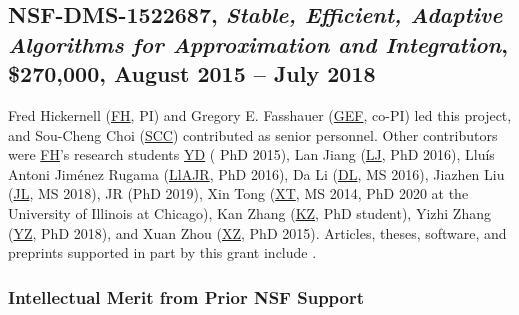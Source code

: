 \documentclass[11pt]{NSFamsart}
\newcommand{\FH}{\hyperlink{FHlink}{FH}\xspace}
\newcommand{\SCTC}{\hyperlink{SCTClink}{SCC}\xspace}
\newcommand{\GEF}{\hyperlink{GEFlink}{GEF}\xspace}
\newcommand{\YD}{\hyperlink{YDlink}{YD}\xspace}
\newcommand{\LlAJR}{\hyperlink{LlAJRlink}{LlAJR}\xspace}
\newcommand{\LJ}{\hyperlink{LJlink}{LJ}\xspace}
\newcommand{\XT}{\hyperlink{XTlink}{XT}\xspace}
\newcommand{\KZ}{\hyperlink{KZlink}{KZ}\xspace}
\newcommand{\DL}{\hyperlink{DLlink}{DL}\xspace}
\newcommand{\XZ}{\hyperlink{XZlink}{XZ}\xspace}
\newcommand{\JL}{\hyperlink{JLlink}{JL}\xspace}
\newcommand{\YZ}{\hyperlink{YZlink}{YZ}\xspace}
\def\abs#1{\ensuremath{\left \lvert #1 \right \rvert}}
\begin{document}
\subsection{NSF-DMS-1522687, \emph{Stable, Efficient, Adaptive Algorithms for
			Approximation and Integration},
		\$270,000, August 2015 -- July 2018} \label{sec:PreviousFred}
Fred Hickernell (\FH, PI) and Gregory E. Fasshauer (\GEF, co-PI) led this project, and Sou-Cheng Choi (\SCTC) contributed as senior personnel.  Other contributors were \FH's research students {\YD} ( PhD 2015), \hypertarget{LJlink}{ Lan Jiang } (\LJ, PhD 2016),
\hypertarget{LlAJRlink}{Llu\'is Antoni Jim\'enez Rugama} (\LlAJR, PhD 2016), \hypertarget{DLlink}{Da Li} (\DL, MS 2016), \hypertarget{JLlink}{Jiazhen Liu} (\JL, MS 2018), JR (PhD 2019), \hypertarget{XTlink}{Xin Tong} (\XT, MS 2014, PhD 2020 at the University of Illinois at Chicago), \hypertarget{KZlink}{Kan Zhang} (\KZ, PhD student), \hypertarget{YZlink}{Yizhi Zhang} (\YZ, PhD 2018), and \hypertarget{XZlink}{Xuan Zhou} (\XZ, PhD 2015).  Articles, theses,
software, and preprints supported in
part by this
grant
include
\cite{ala_augmented_2017,
	ChoEtal17a,
	ChoEtal21a,
	Din15a,
	DinHic20a,
	GilEtal16a,
	Hic17a,
	HicJag18b,
	HicJim16a,
	HicEtal18a,
	HicEtal17a,
	HicKriWoz19a,
	RatHic19a,
	GilJim16b,
	JimHic16a,
	JohFasHic18a,
	Li16a,
	Liu17a,
	MarEtal18a,
	mccourt_stable_2017,
	MCCEtal19a,
	mishra_hybrid_2018,
	MisEtal19a,
	rashidinia_stable_2016,
	rashidinia_stable_2018,
	Zha18a,
	Zha17a,
	Zho15a,
	ZhoHic15a}.

\subsubsection{Intellectual Merit from Prior NSF Support}
\label{previousmeritsubsec}

\end{document}
